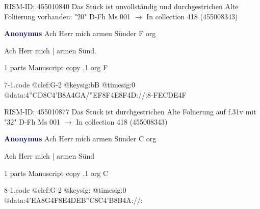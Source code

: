 \documentclass[twocolumn]{book}
\begin{document}
\newline RISM-ID: 455010840
\newline Das Stück ist unvollständig und durchgestrichen
\newline Alte Foliierung vorhanden: "20"
\newline D-Fh  Ms 001
\newline $\rightarrow$ In collection 418 (455008343)

\newline \par \vspace{7pt} \textcolor{darkblue}{\textbf{Anonymus  }}
\newline Ach Herr mich armen Sünder  F  
\newline org
\newline \begin{itshape}[f.31v, at left:] Ach Herr mich | armen Sünd.\end{itshape} 
\newline \textcolor{darkblue}{}  1 parts  
\newline Manuscript copy
.1  org  F  
\begin{filecontents*}{7-1.code}
@clef:G-2
@keysig:bB
@timesig:0
@data:4''CD8C4'B8A4GA/''EF8F4E8F4D://:8-FEC{DE}4F
\end{filecontents*}
\newline
%

\newline RISM-ID: 455010877
\newline Das Stück ist durchgestrichen
\newline Alte Foliierung auf f.31v mit "32"
\newline D-Fh  Ms 001
\newline $\rightarrow$ In collection 418 (455008343)

\newline \par \vspace{7pt} \textcolor{darkblue}{\textbf{Anonymus  }}
\newline Ach Herr mich armen Sünder  C  
\newline org
\newline \begin{itshape}[f.40r, at left:] Ach Herr mich | armen Sünd\end{itshape} 
\newline \textcolor{darkblue}{}  1 parts  
\newline Manuscript copy
.1  org  C  
\begin{filecontents*}{8-1.code}
@clef:G-2
@keysig:
@timesig:0
@data:4'EA8G4F8E4DEB''C8C4'B8B4A://:
\end{filecontents*}
\newline
%
\end{document}

